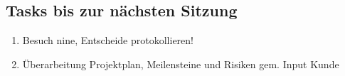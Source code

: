 \documentclass[class=scrbook,crop=false]{standalone}
\begin{document}
    \subsection*{Tasks bis zur nächsten Sitzung}
    
    \begin{enumerate}
        \item Besuch nine, Entscheide protokollieren!
        \item Überarbeitung Projektplan, Meilensteine und Risiken gem. Input Kunde
    \end{enumerate}
\end{document}
